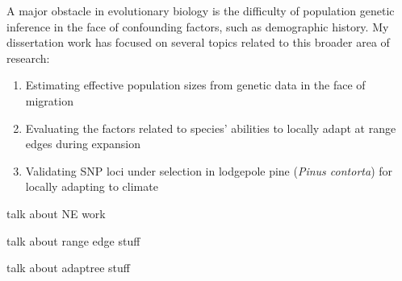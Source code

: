 \renewcommand{\thepage}{Dissertation Summary}


A major obstacle in evolutionary biology is the difficulty of population genetic inference in the face of confounding factors, such as demographic history. My dissertation work has focused on several topics related to this broader area of research:
\begin{enumerate}[nolistsep]
\item Estimating effective population sizes from genetic data in the face of migration
\item Evaluating the factors related to species' abilities to locally adapt at range edges during expansion
\item Validating SNP loci under selection in lodgepole pine (\emph{Pinus contorta}) for locally adapting to climate
\end{enumerate}

talk about NE work

talk about range edge stuff

talk about adaptree stuff
